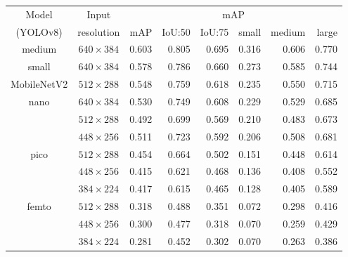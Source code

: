 \begin{table}
    \centering
    \small
    \begin{tabular}{|c|c|rrrrrr|}
        \hline
        Model & Input & \multicolumn{6}{c|}{mAP} \\
        \cline{3-8}
        (YOLOv8)                     & resolution                       & mAP   & IoU:50& IoU:75& small & medium& large \\
        \hline
        \hline
        \multirow{1}{*}{medium}      & \multirow{1}{*}{$640\times384$}  & 0.603 & 0.805 & 0.695 & 0.316 & 0.606 & 0.770 \\
        \hline                                                          
        \multirow{1}{*}{small}       & \multirow{1}{*}{$640\times384$}  & 0.578 & 0.786 & 0.660 & 0.273 & 0.585 & 0.744 \\
        \hline
        \multirow{1}{*}{MobileNetV2} & \multirow{1}{*}{$512\times288$}  & 0.548 & 0.759 & 0.618 & 0.235 & 0.550 & 0.715 \\
        \hline                      
        \multirow{3}{*}{nano}        & \multirow{1}{*}{$640\times384$}  & 0.530 & 0.749 & 0.608 & 0.229 & 0.529 & 0.685 \\
        \cline{2-2}
                                     & \multirow{1}{*}{$512\times288$}  & 0.492 & 0.699 & 0.569 & 0.210 & 0.483 & 0.673 \\
        \cline{2-2}
                                     & \multirow{1}{*}{$448\times256$}  & 0.511 & 0.723 & 0.592 & 0.206 & 0.508 & 0.681 \\
        \hline
        \multirow{3}{*}{pico}        & \multirow{1}{*}{$512\times288$}  & 0.454 & 0.664 & 0.502 & 0.151 & 0.448 & 0.614 \\
        \cline{2-2}
                                     & \multirow{1}{*}{$448\times256$}  & 0.415 & 0.621 & 0.468 & 0.136 & 0.408 & 0.552 \\
        \cline{2-2}
                                     & \multirow{1}{*}{$384\times224$}  & 0.417 & 0.615 & 0.465 & 0.128 & 0.405 & 0.589 \\
        \hline
        \multirow{4}{*}{femto}       & \multirow{1}{*}{$512\times288$}  & 0.318 & 0.488 & 0.351 & 0.072 & 0.298 & 0.416 \\
        \cline{2-2}
                                     & \multirow{1}{*}{$448\times256$}  & 0.300 & 0.477 & 0.318 & 0.070 & 0.259 & 0.429 \\
        \cline{2-2}
                                     & \multirow{1}{*}{$384\times224$}  & 0.281 & 0.452 & 0.302 & 0.070 & 0.263 & 0.386 \\

\end{tabular}
\end{table}
